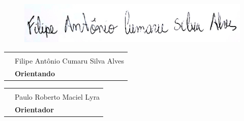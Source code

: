 \documentclass[a4paper, 10pt]{article}
\begin{document}
\vspace{3cm}

\begin{figure}[!htb]
    \centering
    \includegraphics[scale=0.25]{assinatura.jpg}
    \label{fig:my_label}
\end{figure}

\centering
\begin{tabular}{@{}P{1.3cm}P{10cm}@{}}
& \hrulefill \\[0.5cm]
& Filipe Antônio Cumaru Silva Alves \\[0.25cm]
& \textbf{Orientando} \\
\end{tabular}

\vspace{3cm}

\centering
\begin{tabular}{@{}P{1.3cm}P{10cm}@{}}
& \hrulefill \\[0.5cm]
& Paulo Roberto Maciel Lyra \\[0.25cm]
& \textbf{Orientador} \\
\end{tabular}


\clearpage

\raggedright
{}
\printbibliography
\end{document}
